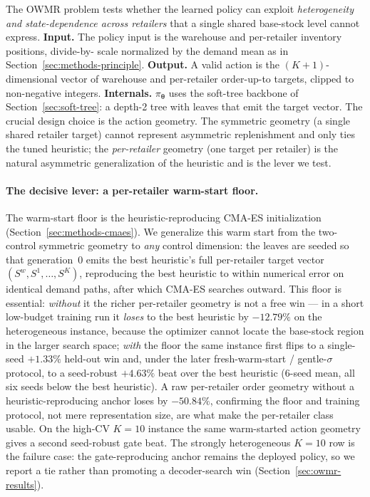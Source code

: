 \documentclass[11pt]{article}
\newcommand{\btheta}{\boldsymbol{\theta}}
\begin{document}
The OWMR problem tests whether the learned policy can exploit \emph{heterogeneity and
state-dependence across retailers} that a single shared base-stock level cannot express.
\textbf{Input.} The policy input is the warehouse and per-retailer inventory positions, divide-by-
scale normalized by the demand mean as in Section~\ref{sec:methods-principle}. \textbf{Output.} A
valid action is the $(K{+}1)$-dimensional vector of warehouse and per-retailer order-up-to targets,
clipped to non-negative integers. \textbf{Internals.}
$\pi_{\btheta}$ uses the soft-tree backbone of Section~\ref{sec:soft-tree}: a depth-2 tree with leaves
that emit the target vector. The crucial design choice is the action geometry. The symmetric
geometry (a single shared retailer target) cannot represent asymmetric replenishment and only ties
the tuned heuristic; the \emph{per-retailer} geometry (one target per
retailer) is the natural asymmetric generalization of the heuristic and is the lever we test.

\paragraph{The decisive lever: a per-retailer warm-start floor.}
The warm-start floor is the heuristic-reproducing CMA-ES initialization (Section~\ref{sec:methods-cmaes}). We
generalize this warm start from the two-control symmetric geometry to \emph{any} control dimension:
the leaves are seeded so that generation~0 emits the best heuristic's full per-retailer target vector
$(S^w,S^1,\dots,S^K)$, reproducing the best heuristic to within numerical error on identical demand paths, after
which CMA-ES searches outward. This floor is essential: \emph{without} it the richer per-retailer
geometry is not a free win --- in a short low-budget training run it \emph{loses} to the best heuristic by $-12.79\%$ on the
heterogeneous instance, because the optimizer cannot locate the base-stock region in the larger
search space; \emph{with} the floor the same instance first flips to a single-seed $+1.33\%$ held-out
win and, under the later fresh-warm-start / gentle-$\sigma$ protocol, to a seed-robust $+4.63\%$
beat over the best heuristic ($6$-seed mean, all six seeds below the best heuristic). A raw per-retailer order geometry without a heuristic-reproducing anchor loses by $-50.84\%$,
confirming the floor and training protocol, not mere representation size, are what make the
per-retailer class usable. On the high-CV $K{=}10$ instance the same warm-started action geometry gives
a second seed-robust gate beat. The strongly heterogeneous $K{=}10$ row is the failure case: the
gate-reproducing anchor remains the deployed policy, so we report a tie rather than promoting a
decoder-search win (Section~\ref{sec:owmr-results}).
\end{document}
